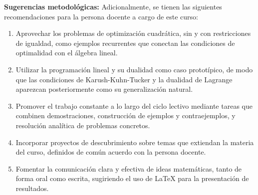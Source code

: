 \begin{refsection}
\textbf{Sugerencias metodológicas:} Adicionalmente, se tienen las siguientes recomendaciones para la persona docente a cargo de este curso:
\begin{enumerate}
    \item Aprovechar los problemas de optimización cuadrática, sin y con restricciones de igualdad, como ejemplos recurrentes que conectan las condiciones de optimalidad con el álgebra lineal.
    \item Utilizar la programación lineal y su dualidad como caso prototípico, de modo que las condiciones de Karush-Kuhn-Tucker y la dualidad de Lagrange aparezcan posteriormente como su generalización natural.
    \item Promover el trabajo constante a lo largo del ciclo lectivo mediante tareas que combinen demostraciones, construcción de ejemplos y contraejemplos, y resolución analítica de problemas concretos.
    \item Incorporar proyectos de descubrimiento sobre temas que extiendan la materia del curso, definidos de común acuerdo con la persona docente.
    \item Fomentar la comunicación clara y efectiva de ideas matemáticas, tanto de forma oral como escrita, sugiriendo el uso de \LaTeX{} para la presentación de resultados.
\end{enumerate}

\nocite{Sun96}
\nocite{LY16}
\nocite{BT97}
\nocite{BV04}
\nocite{Rus06}
\nocite{Ber16}

\printcursosbibliography
\end{refsection}
